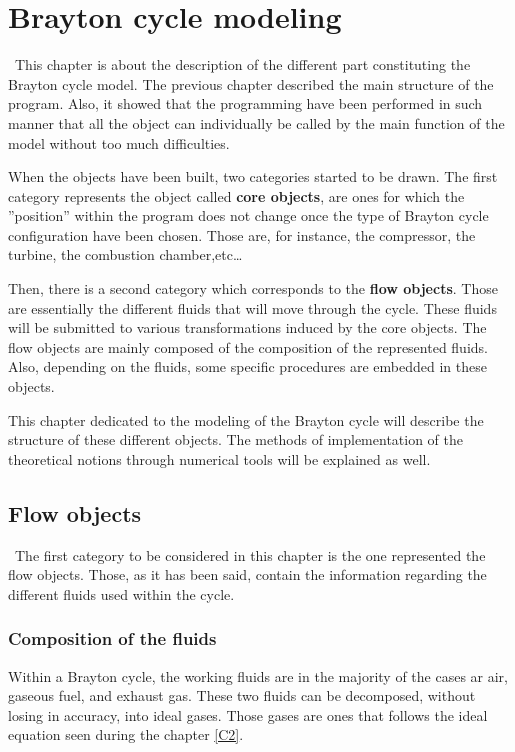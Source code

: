 \graphicspath{{Chapitre_6/Images/}}
\chapter{Brayton cycle modeling}\label{C6}
\quad\, This chapter is about the description of the different part constituting the Brayton cycle model. The previous chapter described the main structure of the program. Also, it showed that the programming have been performed in such manner that all the object can individually be called by the main function of the model without too much difficulties.

When the objects have been built, two categories started to be drawn. The first category represents the object called \textbf{core objects}, are ones for which the ''position'' within the program does not change once the type of Brayton cycle configuration have been chosen. Those are, for instance, the compressor, the turbine, the combustion chamber,etc\dots

Then, there is a second category which corresponds to the \textbf{flow objects}. Those are essentially the different fluids that will move through the cycle. These fluids will be submitted to various transformations induced by the core objects. The flow objects are mainly composed of the composition of the represented fluids. Also, depending on the fluids, some specific procedures are embedded in these objects.

This chapter dedicated to the modeling of the Brayton cycle will describe the structure of these different objects. The methods of implementation of the theoretical notions through numerical tools will be explained as well.

\section{Flow objects}
\quad\ The first category to be considered in this chapter is the one represented the flow objects. Those, as it has been said, contain the information regarding the different fluids used within the cycle.

\subsection{Composition of the fluids}
Within a Brayton cycle, the working fluids are in the majority of the cases ar air, gaseous fuel, and exhaust gas. These two fluids can be decomposed, without losing in accuracy, into ideal gases. Those gases are ones that follows the ideal equation seen during the chapter \ref{C2}. 

